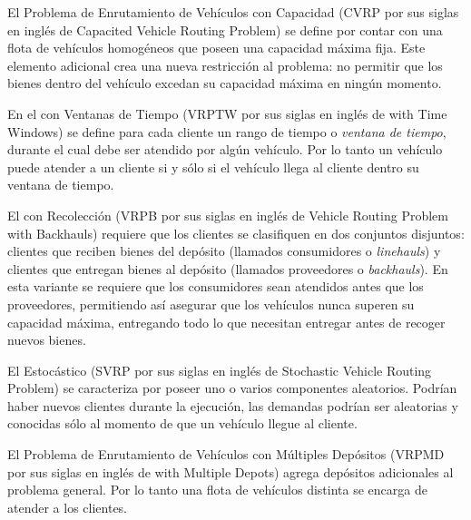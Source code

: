 El Problema de Enrutamiento de Vehículos con Capacidad (CVRP por sus siglas en inglés de Capacited Vehicle Routing Problem) se define por contar con una flota de vehículos homogéneos que poseen una capacidad máxima fija. Este elemento adicional crea una nueva restricción al problema: no permitir que los bienes dentro del vehículo excedan su capacidad máxima en ningún momento.

En el \vrp con Ventanas de Tiempo (VRPTW por sus siglas en inglés de \vrpingles with Time Windows) se define para cada cliente un rango de tiempo o \emph{ventana de tiempo}, durante el cual debe ser atendido por algún vehículo. Por lo tanto un vehículo puede atender a un cliente si y sólo si el vehículo llega al cliente dentro su ventana de tiempo.

El \vrp con Recolección (VRPB por sus siglas en inglés de Vehicle Routing Problem with Backhauls) requiere que los clientes se clasifiquen en dos conjuntos disjuntos: clientes que reciben bienes del depósito (llamados consumidores o \textit{linehauls}) y clientes que entregan bienes al depósito (llamados pro\-ve\-e\-do\-res o \textit{backhauls}). En esta variante se requiere que los consumidores sean atendidos antes que los proveedores, permitiendo así asegurar que los vehículos nunca superen su capacidad máxima, entregando todo lo que necesitan entregar antes de recoger nuevos bienes.

El \vrp Estocástico (SVRP por sus siglas en inglés de Stochastic Vehicle Routing Problem) se caracteriza por poseer uno o varios componentes aleatorios. Podrían haber nuevos clientes durante la ejecución, las demandas podrían ser aleatorias y conocidas sólo al momento de que un vehículo llegue al cliente.


El Problema de Enrutamiento de Vehículos con Múltiples Depósitos (VRPMD por sus siglas en inglés de \vrpingles with Multiple Depots) agrega depósitos adicionales al problema general. Por lo tanto una flota de vehículos distinta se encarga de atender a los clientes.

